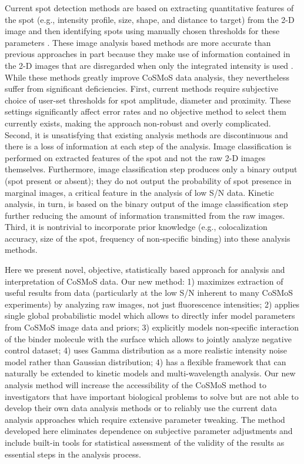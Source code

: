 Current spot detection methods are based on extracting quantitative features of the spot (e.g., intensity profile, size, shape, and distance to target) from the 2-D image and then identifying spots using manually chosen thresholds for these parameters \citep{friedman_cosmos_analysis_2015, smith_automated_2019}. These image analysis based methods are more accurate than previous approaches in part because they make use of information contained in the 2-D images that are disregarded when only the integrated intensity is used \citep{friedman_cosmos_analysis_2015}. While these methods greatly improve CoSMoS data analysis, they nevertheless suffer from significant deficiencies. First, current methods require subjective choice of user-set thresholds for spot amplitude, diameter and proximity. These settings significantly affect error rates and no objective method to select them currently exists, making the approach non-robust and overly complicated. Second, it is unsatisfying that existing analysis methods are discontinuous and there is a loss of information at each step of the analysis. Image classification is performed on extracted features of the spot and not the raw 2-D images themselves. Furthermore, image classification step produces only a binary output (spot present or absent); they do not output the probability of spot presence in marginal images, a critical feature in the analysis of low S/N data. Kinetic analysis, in turn, is based on the binary output of the image classification step further reducing the amount of information transmitted from the raw images. Third, it is nontrivial to incorporate prior knowledge (e.g., colocalization accuracy, size of the spot, frequency of non-specific binding) into these analysis methods.

Here we present novel, objective, statistically based approach for analysis and interpretation of CoSMoS data. Our new method: 1) maximizes extraction of useful results from data (particularly at the low S/N inherent to many CoSMoS experiments) by analyzing raw images, not just fluorescence intensities; 2) applies single global probabilistic model which allows to directly infer model parameters from CoSMoS image data and priors; 3) explicitly models non-specific interaction of the binder molecule with the surface which allows to jointly analyze negative control dataset; 4) uses Gamma distribution as a more realistic intensity noise model rather than Gaussian distribution; 4) has a flexible framework that can naturally be extended to kinetic models and multi-wavelength analysis. Our new analysis method will increase the accessibility of the CoSMoS method to investigators that have important biological problems to solve but are not able to develop their own data analysis methods or to reliably use the current data analysis approaches which require extensive parameter tweaking. The method developed here eliminates dependence on subjective parameter adjustments and include built-in tools for statistical assessment of the validity of the results as essential steps in the analysis process.

